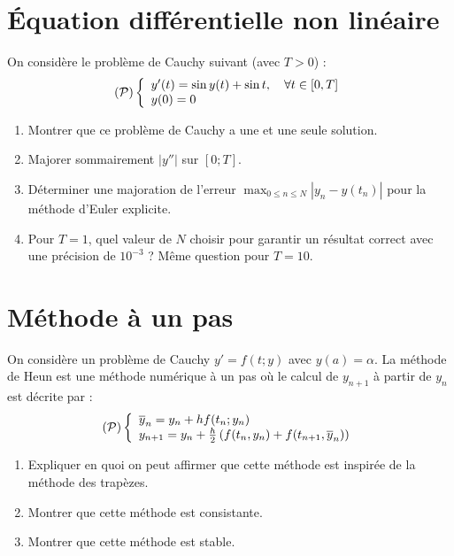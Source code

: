 \documentclass[a4paper]{article}
\begin{document}
\section{Équation différentielle non linéaire}
 On considère le problème de Cauchy suivant (avec $T > 0$) :
\[({\cal P})\left\{\begin{array}{l}
y'(t)= \sin y(t) + \sin t,\quad \forall t\in[0,T]\\
y(0)=0
\end{array}\right.\]
\begin{enumerate}
\item  Montrer que ce problème de Cauchy a une et une seule solution.
\item  Majorer sommairement $|y''|$ sur $[0; T]$.
\item  Déterminer une majoration de l'erreur $\max_{0\leq n\leq N}\left|y_n-y(t_n)\right|$
 pour la méthode d'Euler explicite.
\item  Pour $T = 1$, quel valeur de $N$ choisir pour garantir un résultat correct avec une précision de $10^{-3}$ ? Même question pour $T = 10$.
\end{enumerate}


\section{Méthode à un pas}
 On considère un problème de Cauchy $y' = f(t; y)$ avec $y(a) = \alpha$.
La méthode de Heun est une méthode numérique à un pas où le calcul de $y_{n+1}$ à partir de $y_n$ est décrite par :
\[({\cal P})\left\{\begin{array}{l}
\overline{y}_n= y_n + hf(t_n; y_n)\\
y_{n+1} = y_n +\frac h2\left(f(t_n,y_n) + f(t_{n+1},\overline{y}_n)\right)
\end{array}\right.\]

\begin{enumerate}
\item  Expliquer en quoi on peut affirmer que cette méthode est inspirée de la méthode des
trapèzes.
\item   Montrer que cette méthode est consistante.
\item  Montrer que cette méthode est stable.
\end{enumerate}
\end{document}
